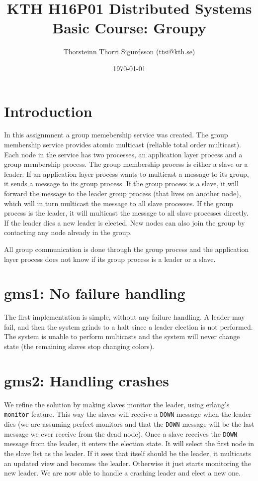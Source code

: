 \documentclass[a4paper, 11pt]{article}
\title{KTH H16P01 Distributed Systems Basic Course: Groupy}
\author{Thorsteinn Thorri Sigurdsson (ttsi@kth.se)}
\date{\today{}}
\begin{document}
\maketitle

\section{Introduction}

In this assignmnent a group memebership service was created. The group membership service provides atomic multicast (reliable total order multicast). Each node in the service has two processes, an application layer process and a group membership process. The group membership process is either a slave or a leader. If an application layer process wants to multicast a message to its group, it sends a message to its group process. If the group process is a slave, it will forward the message to the leader group process (that lives on another node), which will in turn multicast the message to all slave processes. If the group process is the leader, it will multicast the message to all slave processes directly. If the leader dies a new leader is elected. New nodes can also join the group by contacting any node already in the group.

All group communication is done through the group process and the application layer process does not know if its group process is a leader or a slave.

\section{gms1: No failure handling}

The first implementation is simple, without any failure handling. A leader may fail, and then the system grinds to a halt since a leader election is not performed. The system is unable to perform multicasts and the system will never change state (the remaining slaves stop changing colors).

\section{gms2: Handling crashes}

We refine the solution by making slaves monitor the leader, using erlang's \texttt{monitor} feature. This way the slaves will receive a \texttt{DOWN} message when the leader dies (we are assuming perfect monitors and that the \texttt{DOWN} message will be the last message we ever receive from the dead node). Once a slave receives the \texttt{DOWN} message from the leader, it enters the election state. It will select the first node in the slave list as the leader. If it sees that itself should be the leader, it multicasts an updated view and becomes the leader. Otherwise it just starts monitoring the new leader. We are now able to handle a crashing leader and elect a new one.
\end{document}
